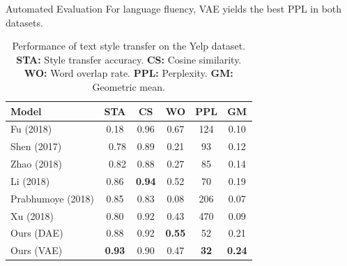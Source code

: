 \documentclass[final]{beamer}
\newlength{\onecolwid}
\newlength{\twocolwid}
\begin{document}
\begin{frame}[t]
\begin{columns}[t]
\begin{column}{\twocolwid}
\begin{columns}[t,totalwidth=\twocolwid]
\begin{column}{\onecolwid}
\begin{block}{Automated Evaluation}
                        For language fluency, VAE yields the best PPL in both datasets.

                        \begin{table}[ht]
                            \centering
                            \begin{tabular}{l c c c c c}
                                \textbf{Model}    & \textbf{STA}     & \textbf{CS}       & \textbf{WO}       & \textbf{PPL}     & \textbf{GM}       \\
                                \hline
                                Fu (2018)         & \color{gray}0.18 & \color{gray} 0.96 & \color{gray} 0.67 & \color{gray} 124 & \color{gray} 0.10 \\
                                Shen (2017)       & \ 0.78           & 0.89              & 0.21              & 93               & 0.12              \\
                                Zhao (2018)       & \ 0.82           & 0.88              & 0.27              & 85               & 0.14              \\
                                Li (2018)         & 0.86             & \textbf{0.94}     & 0.52              & 70               & 0.19              \\
                                Prabhumoye (2018) & 0.85             & 0.83              & 0.08              & 206              & 0.07              \\
                                Xu (2018)         & 0.80             & 0.92              & 0.43              & 470              & 0.09              \\
                                Ours (DAE)        & 0.88             & 0.92              & \textbf{0.55}     & 52               & 0.21              \\
                                Ours (VAE)        & \textbf{0.93}    & 0.90              & 0.47              & \textbf{32}      & \textbf{0.24}     \\
                            \end{tabular}
                            \caption{Performance of text style transfer on the Yelp dataset. \textbf{STA:} Style transfer accuracy. \textbf{CS:} Cosine similarity. \textbf{WO:} Word overlap rate. \textbf{PPL:} Perplexity. \textbf{GM:} Geometric mean.}
                            \label{tab:comparison-previous}
                        \end{table}



\end{block}
\end{column}
\end{columns}
\end{column}
\end{columns}
\end{frame}
\end{document}
